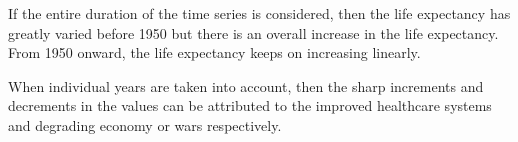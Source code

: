 \noindent If the entire duration of the time series is considered, then the life expectancy has greatly varied before 1950 but there is an overall increase in the life expectancy. From 1950 onward, the life expectancy keeps on increasing linearly. 

\noindent When individual years are taken into account, then the sharp increments and decrements in the values can be attributed to the improved healthcare systems and degrading economy or wars respectively.